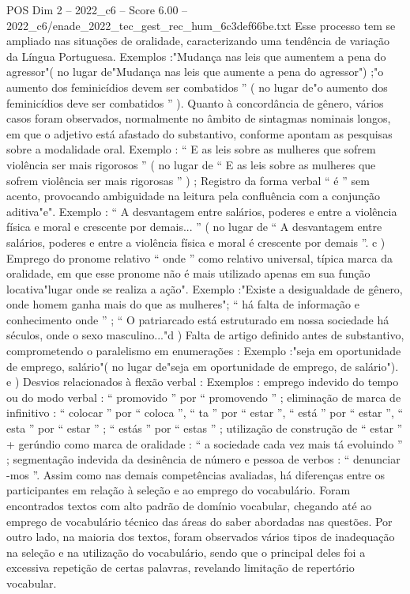 \begin{textsample}{POS Dim 2 – 2022\_c6 – Score 6.00 – 2022\_c6/enade\_2022\_tec\_gest\_rec\_hum\_6c3def66be.txt}
Esse processo tem se ampliado nas situações de oralidade, caracterizando uma tendência de variação da Língua Portuguesa.
Exemplos :"Mudança nas leis que aumentem a pena do agressor"( no lugar de"Mudança nas leis que aumente a pena do agressor") ;"o aumento dos feminicídios devem ser combatidos ” ( no lugar de"o aumento dos feminicídios deve ser combatidos ” ).
Quanto à concordância de gênero, vários casos foram observados, normalmente no âmbito de sintagmas nominais longos, em que o adjetivo está afastado do substantivo, conforme apontam as pesquisas sobre a modalidade oral.
Exemplo : “ E as leis sobre as mulheres que sofrem violência ser mais rigorosos ” ( no lugar de “ E as leis sobre as mulheres que sofrem violência ser mais rigorosas ” ) ; Registro da forma verbal “ é ” sem acento, provocando ambiguidade na leitura pela confluência com a conjunção aditiva"e".
Exemplo : “ A desvantagem entre salários, poderes e entre a violência física e moral e crescente por demais... ” ( no lugar de “ A desvantagem entre salários, poderes e entre a violência física e moral é crescente por demais ”. c ) Emprego do pronome relativo “ onde ” como relativo universal, típica marca da oralidade, em que esse pronome não é mais utilizado apenas em sua função locativa"lugar onde se realiza a ação".
Exemplo :"Existe a desigualdade de gênero, onde homem ganha mais do que as mulheres"; “ há falta de informação e conhecimento onde ” ; “ O patriarcado está estruturado em nossa sociedade há séculos, onde o sexo masculino..."d ) Falta de artigo definido antes de substantivo, comprometendo o paralelismo em enumerações : Exemplo :"seja em oportunidade de emprego, salário"( no lugar de"seja em oportunidade de emprego, de salário"). e ) Desvios relacionados à flexão verbal : Exemplos : emprego indevido do tempo ou do modo verbal : “ promovido ” por “ promovendo ” ; eliminação de marca de infinitivo : “ colocar ” por “ coloca ”, “ ta ” por “ estar ”, “ está ” por “ estar ”, “ esta ” por “ estar ” ; “ estás ” por “ estas ” ; utilização de construção de “ estar ” + gerúndio como marca de oralidade : “ a sociedade cada vez mais tá evoluindo ” ; segmentação indevida da desinência de número e pessoa de verbos : “ denunciar -mos ”.
Assim como nas demais competências avaliadas, há diferenças entre os participantes em relação à seleção e ao emprego do vocabulário.
Foram encontrados textos com alto padrão de domínio vocabular, chegando até ao emprego de vocabulário técnico das áreas do saber abordadas nas questões.
Por outro lado, na maioria dos textos, foram observados vários tipos de inadequação na seleção e na utilização do vocabulário, sendo que o principal deles foi a excessiva repetição de certas palavras, revelando limitação de repertório vocabular.

\end{textsample}
